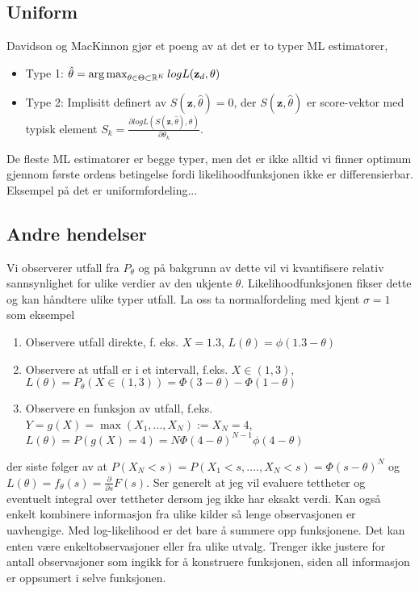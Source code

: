 \subsection{Uniform}
Davidson og MacKinnon gjør et poeng av at det er to typer ML estimatorer,
\begin{itemize}
\item Type 1: $\hat{\theta} = \operatorname*{arg\,max}_{\theta \in \Theta \subset \mathbb{R}^K} logL(\mathbf{z}_d,\theta)$
\item Type 2: Implisitt definert av $S(\mathbf{z},\hat{\theta})=0$, der $S(\mathbf{z},\hat{\theta})$ er score-vektor med typisk element $S_k = \frac{\partial logL(S(\mathbf{z},\hat{\theta}),\theta)}{\partial \theta_k}$.
\end{itemize}
De fleste ML estimatorer er begge typer, men det er ikke alltid vi finner optimum gjennom første ordens betingelse fordi likelihoodfunksjonen ikke er differensierbar. Eksempel på det er uniformfordeling... 
\subsection{Andre hendelser}
Vi observerer utfall fra $P_{\theta}$ og på bakgrunn av dette vil vi kvantifisere relativ sannsynlighet for ulike verdier av den ukjente $\theta$. Likelihoodfunksjonen fikser dette og kan håndtere ulike typer utfall. La oss ta normalfordeling med kjent $\sigma=1$ som eksempel
\begin{enumerate}
\item Observere utfall direkte, f. eks. $X=1.3$, $L(\theta) = \phi(1.3-\theta)$
\item Observere at utfall er i et intervall, f.eks. $X\in (1,3)$, $L(\theta) = P_{\theta}(X\in (1,3)) = \Phi(3-\theta)-\Phi(1-\theta)$
\item Observere en funksjon av utfall, f.eks. $Y = g(X) = \max(X_1,...,X_N) := X_{N}=4$, $L(\theta) = P(g(X)=4) =  N\Phi(4-\theta)^{N-1}\phi(4-\theta)$
\end{enumerate}
der siste følger av at $P(X_{N}<s) = P(X_1<s,....,X_N<s) = \Phi(s-\theta)^N$ og $L(\theta) = f_{\theta}(s) = \frac{\partial}{\partial s}F(s)$. Ser generelt at jeg vil evaluere tettheter og eventuelt integral over tettheter dersom jeg ikke har eksakt verdi. Kan også enkelt kombinere informasjon fra ulike kilder så lenge observasjonen er uavhengige. Med log-likelihood er det bare å summere opp funksjonene. Det kan enten være enkeltobservasjoner eller fra ulike utvalg. Trenger ikke justere for antall observasjoner som ingikk for å konstruere funksjonen, siden all informasjon er oppsumert i selve funksjonen.
